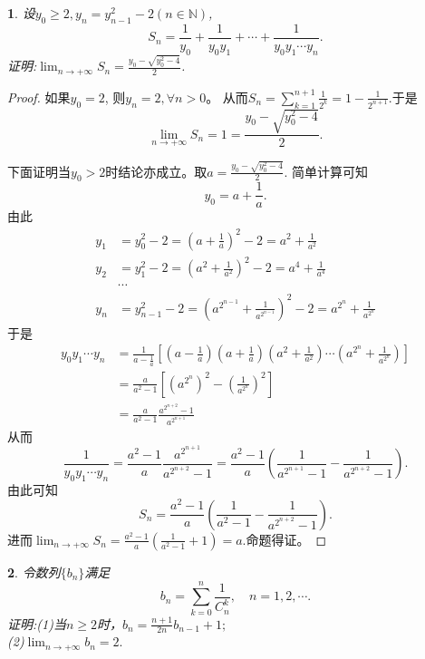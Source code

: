 \documentclass[utf8]{book}
\newtheorem{example}{}[section]             %
\begin{document}
\begin{example}
设$y_0\geq 2, y_n = y_{n-1}^2 - 2(n\in\mathbb{N})$,
\[
S_n=\frac{1}{y_0}+\frac{1}{y_0y_1} +\cdots + \frac{1}{y_0y_1\cdots y_n}.
\]证明:$\displaystyle\lim_{n\to +\infty}S_n=\frac{y_0-\sqrt{y_0^2-4}}{2}$.
\end{example}
\begin{proof}
如果$y_0=2$, 则$y_n = 2, \forall n > 0$。 从而$S_n = \displaystyle\sum_{k=1}^{n+1}\frac{1}{2^k} = 1 - \frac{1}{2^{n+1}}$.于是
$$\displaystyle\lim_{n\to +\infty}S_n = 1 =\frac{y_0-\sqrt{y_0^2 - 4}}{2}.$$

下面证明当$y_0 > 2$时结论亦成立。取$a =\frac{y_0-\sqrt{y_0^2 - 4}}{2}$. 简单计算可知
$$y_0 = a + \frac{1}{a}.$$
由此
\begin{equation*}
\begin{split}
y_1 &= y_0^2 - 2 =\left(a+\frac{1}{a}\right)^2 - 2 = a^2 +\frac{1}{a^2}\\
y_2 &= y_1^2 - 2 = \left(a^2 +\frac{1}{a^2}\right)^2 -2 = a^4 + \frac{1}{a^4}\\ 
 &\cdots\\
y_n &=y^2_{n-1} -2  = \left(a^{2^{n-1}} +\frac{1}{a^{2^{n-1}}}\right)^2 - 2 = a^{2^n} + \frac{1}{a^{2^n}}
\end{split}
\end{equation*}
于是
\begin{equation*}
\begin{split}
y_0y_1\cdots y_n &= \frac{1}{a-\frac{1}{a}}\left[\left(a-\frac{1}{a}\right)\left(a+\frac{1}{a}\right)\left(a^2 +\frac{1}{a^2}\right)\cdots\left(a^{2^n} + \frac{1}{a^{2^n}}\right)\right] \\
&=\frac{a}{a^2-1}\left[\left(a^{2^n}\right)^2 - \left(\frac{1}{a^{2^n}}\right)^2\right]\\
&=\frac{a}{a^2-1}\frac{a^{2^{n+2}} - 1}{a^{2^{n+1}}}
\end{split}
\end{equation*}
从而
$$\frac{1}{y_0y_1\cdots y_n} = \frac{a^2-1}{a}\frac{a^{2^{n+1}}}{a^{2^{n+2}} -1} =\frac{a^2-1}{a}\left(\frac{1}{a^{2^{n+1}} -1} - \frac{1}{a^{2^{n+2}}-1}\right).$$
由此可知
$$S_n = \frac{a^2-1}{a}\left(\frac{1}{a^2 -1} - \frac{1}{a^{2^{n+2}}-1}\right).$$
进而$\displaystyle\lim_{n\to +\infty}S_n = \frac{a^2-1}{a}\left(\frac{1}{a^2 -1} + 1\right) = a$.命题得证。
\end{proof}
\begin{example}
令数列$\{b_n\}$满足
$$b_n=\displaystyle\sum_{k=0}^n\frac{1}{C^k_n}, \quad n =1,2,\cdots.$$
证明:(1)当$n\geq 2$时，$b_n=\displaystyle\frac{n+1}{2n}b_{n-1} + 1;$\\
(2)$\displaystyle\lim_{n\to +\infty}b_n = 2.$
\end{example}
\end{document}
